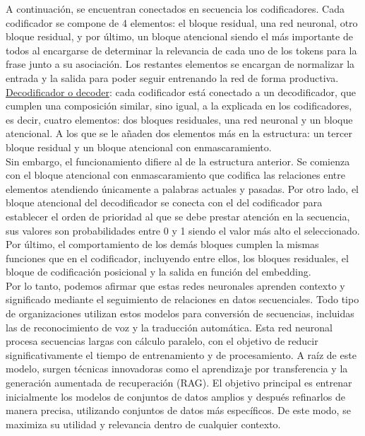 A continuación, se encuentran conectados en secuencia los codificadores. Cada codificador se compone de 4 elementos: el bloque residual, una red neuronal, otro bloque residual, y por último, un bloque atencional siendo el más importante de todos al encargarse de determinar la relevancia de cada uno de los tokens para la frase junto a su asociación. Los restantes elementos se encargan de normalizar la entrada y la salida para poder seguir entrenando la red de forma productiva. \\

\underline{Decodificador o decoder}: cada codificador está conectado a un decodificador, que cumplen una composición similar, sino igual,  a  la explicada en los codificadores, es decir, cuatro elementos: dos bloques residuales, una red neuronal y un bloque atencional. A los que se le añaden dos elementos más en la estructura: un tercer bloque residual y un bloque atencional con enmascaramiento. \\

Sin embargo, el funcionamiento difiere al de la estructura anterior. Se comienza con el bloque atencional con enmascaramiento que codifica las relaciones entre elementos atendiendo únicamente a palabras actuales y pasadas. Por otro lado, el bloque atencional del decodificador se conecta con el del codificador para establecer el orden de prioridad al que se debe prestar atención en la secuencia, sus valores son probabilidades entre 0 y 1 siendo el valor más alto el seleccionado. Por último, el comportamiento de los demás bloques cumplen la mismas funciones que en el codificador, incluyendo entre ellos, los bloques residuales, el bloque de codificación posicional y la salida en función del embedding.  \\

Por lo tanto, podemos afirmar que estas redes neuronales aprenden contexto y significado mediante el seguimiento de relaciones en datos secuenciales. Todo tipo de organizaciones utilizan estos modelos para conversión de secuencias, incluidas las de reconocimiento de voz y la traducción automática. Esta red neuronal procesa secuencias largas con cálculo paralelo, con el objetivo de reducir significativamente el tiempo de entrenamiento y de procesamiento.
A raíz de este modelo, surgen técnicas innovadoras como el aprendizaje por transferencia y la generación aumentada de recuperación (RAG). El objetivo principal es entrenar inicialmente los modelos de conjuntos de datos amplios y después refinarlos de manera precisa, utilizando conjuntos de datos más específicos. De este modo, se maximiza su utilidad y relevancia dentro de cualquier contexto.\\

